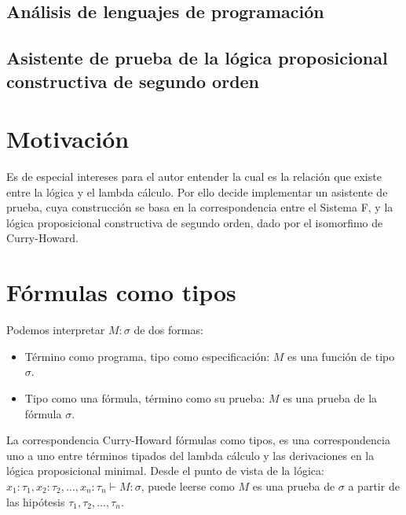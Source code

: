 \documentclass[a4paper,11pt]{article}
\title{}
\author{}
\theoremstyle{definition}
\theoremstyle{remark}
\begin{document}
\maketitle 

\begin{center}
\section*{Análisis de lenguajes de programación} 
\subsection*{Asistente de prueba de la lógica proposicional constructiva de segundo orden}
\end{center}

\newpage{\pagestyle{empty}\cleardoublepage}


\section{Motivación}
Es de especial intereses para el autor entender la cual es la relación que existe entre la lógica y el lambda cálculo.
Por ello decide implementar un asistente de prueba, cuya construcción se basa en la correspondencia
entre el Sistema F, y la lógica proposicional constructiva de segundo orden, dado por el isomorfimo de Curry-Howard.
 
\section{Fórmulas como tipos}
Podemos interpretar $M : \sigma$ de dos formas:
\begin{itemize}
  \item Término como programa, tipo como especificación: $M$ es una función de tipo $\sigma$.
  \item Tipo como una fórmula, término como su prueba: $M$ es una prueba de la fórmula $\sigma$.
\end{itemize}

La correspondencia Curry-Howard fórmulas como tipos, es una correspondencia uno a uno entre términos
tipados del lambda cálculo y las derivaciones en la lógica proposicional minimal.
Desde el punto de vista de la lógica: $x_{1}:\tau_{1}, x_{2}:\tau_{2}, \ldots, x_{n}:\tau_{n} \vdash M : \sigma$,
puede leerse como $M$ es una prueba de $\sigma$ a partir de las hipótesis $\tau_{1}, \tau_{2}, \ldots, \tau_{n}$.  
 
\end{document}
